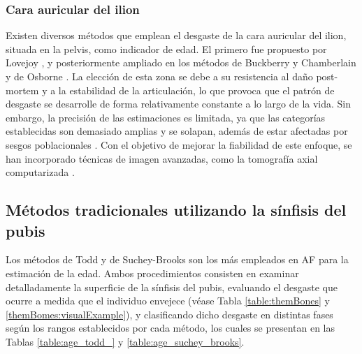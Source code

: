 \subsubsection{Cara auricular del ilion}
Existen diversos métodos que emplean el desgaste de la cara auricular del ilion, situada en la pelvis, como indicador de edad. El primero fue propuesto por Lovejoy \cite{lovejoy1985chronological}, y posteriormente ampliado en los métodos de Buckberry y Chamberlain \cite{buckberry_age_2002} y de Osborne \cite{osborne_reconsidering_2004}. La elección de esta zona se debe a su resistencia al daño post-mortem y a la estabilidad de la articulación, lo que provoca que el patrón de desgaste se desarrolle de forma relativamente constante a lo largo de la vida. Sin embargo, la precisión de las estimaciones es limitada, ya que las categorías establecidas son demasiado amplias y se solapan, además de estar afectadas por sesgos poblacionales \cite{falys2006auricular, michopoulou2017auricular}. Con el objetivo de mejorar la fiabilidad de este enfoque, se han incorporado técnicas de imagen avanzadas, como la tomografía axial computarizada \cite{warrier_applicability_2024, villa2013reliability}.

\subsection{Métodos tradicionales utilizando la sínfisis del pubis}
Los métodos de Todd y de Suchey-Brooks son los más empleados en AF para la estimación de la edad. Ambos procedimientos consisten en examinar detalladamente la superficie de la sínfisis del pubis, evaluando el desgaste que ocurre a medida que el individuo envejece (véase Tabla \ref{table:themBones} y \ref{themBomes:visualExample}), y clasificando dicho desgaste en distintas fases según los rangos establecidos por cada método, los cuales se presentan en las Tablas \ref{table:age_todd_} y \ref{table:age_suchey_brooks}.

\begin{table}[h]
\centering
{}
\caption{Rangos de edad del Método de Todd.}
\label{table:age_todd_}
\end{table}

